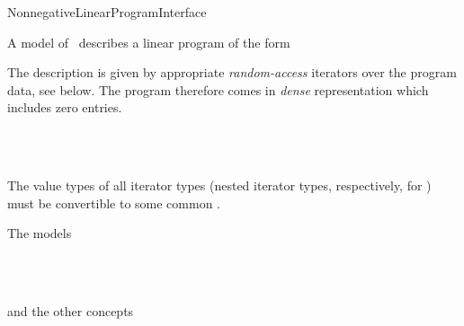 \begin{ccRefConcept}{NonnegativeLinearProgramInterface}

\ccDefinition
A model of \ccRefName\ describes a linear program of the form


The description is given by appropriate \emph{random-access} 
iterators over the program data, see below. The program therefore 
comes in \emph{dense} representation which includes zero entries.

\ccHasModels
{}\\
\\


\ccTypes





\ccOperations






\ccRequirements

The value types of all iterator types (nested iterator types,
respectively, for ) must be convertible to some common
 .

\ccSeeAlso
The models

\\
\\

and the other concepts

\\
\\
\end{ccRefConcept}

